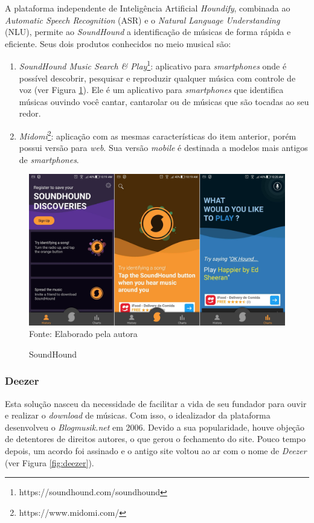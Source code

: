 A plataforma independente de Inteligência Artificial \textit{Houndify}, combinada ao \textit{Automatic Speech Recognition} (ASR) e o \textit{Natural Language Understanding} (NLU), permite ao \textit{SoundHound} a identificação de músicas de forma rápida e eficiente. Seus dois produtos conhecidos no meio musical são:

\begin{enumerate}
    \item \textit{SoundHound Music Search \& Play}\footnote{https://soundhound.com/soundhound}: aplicativo para \textit{smartphones} onde é possível descobrir, pesquisar e reproduzir qualquer música com controle de voz (ver Figura \ref{fig:soundHound}). Ele é um aplicativo para \textit{smartphones} que identifica músicas ouvindo você cantar, cantarolar ou de músicas que são tocadas ao seu redor.
    \item \textit{Midomi}\footnote{https://www.midomi.com/}: aplicação com as mesmas características do item anterior, porém possui versão para \textit{web}. Sua  versão \textit{mobile} é destinada a modelos mais antigos de \textit{smartphones}.
\end{enumerate}

\begin{figure}[!htb]
   \centering
   \caption{SoundHound}\label{fig:soundHound} 
   \includegraphics[scale=0.12]{figuras/soundhound.jpg}
   \\Fonte: Elaborado pela autora
\end{figure}

\subsubsection{Deezer} \label{subsec:deezer}
Esta solução nasceu da necessidade de facilitar a vida de seu fundador para ouvir e realizar o \textit{download} de músicas. Com isso, o idealizador da plataforma desenvolveu o \textit{Blogmusik.net} em 2006. Devido a sua popularidade, houve objeção de detentores de direitos autores, o que gerou o fechamento do site. Pouco tempo depois, um acordo foi assinado e o antigo site voltou ao ar com o nome de \textit{Deezer} (ver Figura \ref{fig:deezer}).

